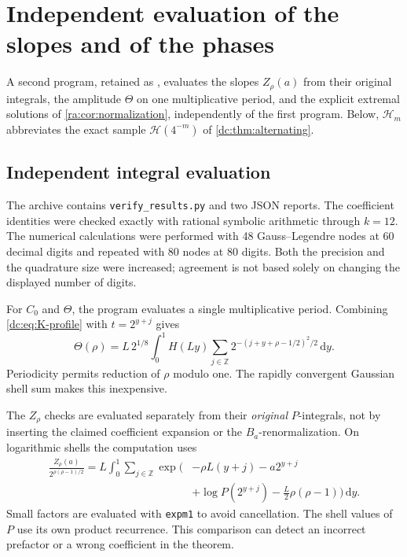 \documentclass[11pt,a4paper,oneside,openany]{book}
\numberwithin{equation}{chapter}
\theoremstyle{definition}
\theoremstyle{remark}
\newcommand{\Z}{\mathbb Z}
\newcommand{\dd}{\,\mathrm d}
\newcommand{\calH}{\mathcal H}
\begin{document}
\section{Independent evaluation of the slopes and of the phases}
\label{ra:sec:numerics}
A second program, retained as ,
evaluates the slopes $Z_\rho(a)$ from their original integrals, the
amplitude $\Theta$ on one multiplicative period, and the explicit extremal
solutions of \cref{ra:cor:normalization}, independently of the first
program. Below, $\calH_m$ abbreviates the exact sample $\calH(4^{-m})$ of
\cref{dc:thm:alternating}.

\subsection{Independent integral evaluation}
The archive contains \texttt{verify\_results.py} and two JSON reports.
The coefficient identities were checked exactly with rational symbolic
arithmetic through $k=12$. The numerical calculations were performed
with 48 Gauss--Legendre nodes at 60 decimal digits and repeated with
80 nodes at 80 digits. Both the precision and the quadrature size were
increased; agreement is not based solely on changing the displayed number
of digits.

For $C_0$ and $\Theta$, the program evaluates a single multiplicative
period. Combining \eqref{dc:eq:K-profile} with $t=2^{y+j}$ gives
\begin{equation}\label{ra:eq:onecellTheta}
 \Theta(\rho)=L\,2^{1/8}
 \int_0^1 H(Ly)\sum_{j\in\Z}
 2^{-(j+y+\rho-1/2)^2/2}\dd y.
\end{equation}
Periodicity permits reduction of $\rho$ modulo one.
The rapidly convergent Gaussian shell sum makes this inexpensive.

The $Z_\rho$ checks are evaluated separately from their \emph{original}
$P$-integrals, not by inserting the claimed coefficient expansion or the
$B_a$-renormalization. On logarithmic shells the computation uses
\begin{equation}\label{ra:eq:onecellC}
 \begin{split}
 \frac{Z_\rho(a)}{2^{\rho(\rho-1)/2}}
  =L\int_0^1\sum_{j\in\Z}
  \exp\bigl(&-\rho L(y+j)-a2^{y+j}\\
       &+\log P(2^{y+j})-\tfrac L2\rho(\rho-1)\bigr)\dd y.
 \end{split}
\end{equation}
Small factors are evaluated with \texttt{expm1} to avoid cancellation.
The shell values of $P$ use its own product recurrence. This comparison
can detect an incorrect prefactor or a wrong coefficient in the theorem.
\end{document}

